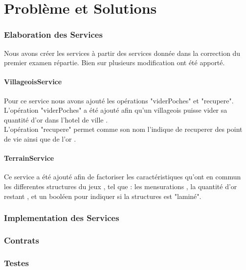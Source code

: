 \part{Problème et Solutions}

\section{Elaboration des Services}
Nous avons créer les services à partir des services donnée dans la correction du premier examen répartie. Bien sur plusieurs modification ont été apporté.
	\subsection{VillageoisService}
	Pour ce service nous avons ajouté les opérations "viderPoches" et "recupere".
	L'opération "viderPoches" a été ajouté afin qu'un villageois puisse vider sa quantité d'or dans l'hotel de ville .\\
	L'opération "recupere" permet comme son nom l'indique de recuperer des point de vie ainsi que de l'or .
	
	\subsection{TerrainService}
	Ce service a été ajouté afin de factoriser les caractéristiques qu'ont en commun les differentes structures du jeux , tel que : les mensurations , la quantité d'or restant , et un booléen pour indiquer si la structures est "laminé".
	
	

\section{Implementation des Services}

\section{Contrats}

\section{Testes}
